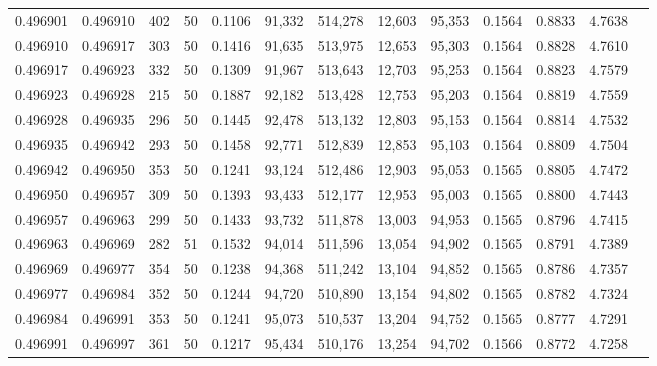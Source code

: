 \begin{tabular}{rrrrrrrrrrrrr}
0.496901 & 0.496910 & 402 &  50 &                                     0.1106 &  91,332 & 514,278 &  12,603 &  95,353 & 0.1564 & 0.8833 & 4.7638 \\
0.496910 & 0.496917 & 303 &  50 &                                     0.1416 &  91,635 & 513,975 &  12,653 &  95,303 & 0.1564 & 0.8828 & 4.7610 \\
0.496917 & 0.496923 & 332 &  50 &                                     0.1309 &  91,967 & 513,643 &  12,703 &  95,253 & 0.1564 & 0.8823 & 4.7579 \\
0.496923 & 0.496928 & 215 &  50 &                                     0.1887 &  92,182 & 513,428 &  12,753 &  95,203 & 0.1564 & 0.8819 & 4.7559 \\
0.496928 & 0.496935 & 296 &  50 &                                     0.1445 &  92,478 & 513,132 &  12,803 &  95,153 & 0.1564 & 0.8814 & 4.7532 \\
0.496935 & 0.496942 & 293 &  50 &                                     0.1458 &  92,771 & 512,839 &  12,853 &  95,103 & 0.1564 & 0.8809 & 4.7504 \\
0.496942 & 0.496950 & 353 &  50 &                                     0.1241 &  93,124 & 512,486 &  12,903 &  95,053 & 0.1565 & 0.8805 & 4.7472 \\
0.496950 & 0.496957 & 309 &  50 &                                     0.1393 &  93,433 & 512,177 &  12,953 &  95,003 & 0.1565 & 0.8800 & 4.7443 \\
0.496957 & 0.496963 & 299 &  50 &                                     0.1433 &  93,732 & 511,878 &  13,003 &  94,953 & 0.1565 & 0.8796 & 4.7415 \\
0.496963 & 0.496969 & 282 &  51 &                                     0.1532 &  94,014 & 511,596 &  13,054 &  94,902 & 0.1565 & 0.8791 & 4.7389 \\
0.496969 & 0.496977 & 354 &  50 &                                     0.1238 &  94,368 & 511,242 &  13,104 &  94,852 & 0.1565 & 0.8786 & 4.7357 \\
0.496977 & 0.496984 & 352 &  50 &                                     0.1244 &  94,720 & 510,890 &  13,154 &  94,802 & 0.1565 & 0.8782 & 4.7324 \\
0.496984 & 0.496991 & 353 &  50 &                                     0.1241 &  95,073 & 510,537 &  13,204 &  94,752 & 0.1565 & 0.8777 & 4.7291 \\
0.496991 & 0.496997 & 361 &  50 &                                     0.1217 &  95,434 & 510,176 &  13,254 &  94,702 & 0.1566 & 0.8772 & 4.7258 \\

\end{tabular}
